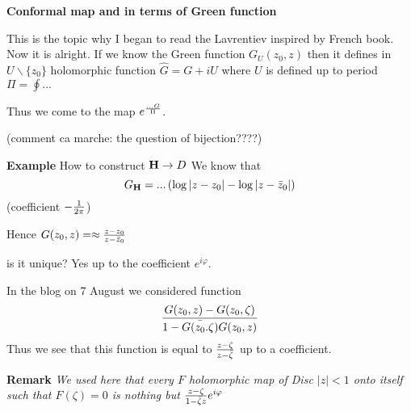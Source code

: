   





\baselineskip=14pt
\def\vare {\varepsilon}
\def\A {{\bf A}}
\def\t {\tilde}
\def\a {\alpha}
\def\K {{\bf K}}
\def\N {{\bf N}}
\def\w {\omega}
\def\s {{\sigma}}
\def\S {{\Sigma}}
\def\s {{\sigma}}
\def\p{\partial}
\def\vare{{\varepsilon}}
\def\Q {{\bf Q}}
\def\D {{\cal D}}
\def\G {{\Gamma}}
\def\C {{\bf C}}
\def\L {{\cal L}}
\def\Z {{\bf Z}}
\def\U  {{\cal U}}
\def\H {{\bf H}}
\def\R  {{\bf R}}
\def\S  {{\bf S}}
\def\E  {{\bf E}}
\def\l {\lambda}
\def\degree {{\bf {\rm degree}\,\,}}
\def \finish {${\,\,\vrule height1mm depth2mm width 8pt}$}
\def \m {\medskip}
\def\p {\partial}
\def\r {{\bf r}}
\def\pt {{\bf pt}}
\def\v {{\bf v}}
\def\n {{\bf n}}
\def\t {{\bf t}}
\def\b {{\bf b}}
\def\c {{\bf c }}
\def\e{{\bf e}}
\def\ac {{\bf a}}
\def \X   {{\bf X}}
\def \Y   {{\bf Y}}
\def \x   {{\bf x}}
\def \y   {{\bf y}}
\def \G{{\cal G}}
\def\ss  {\sigma_{\rm sph}}
\def\grad {{\rm grad\,}}



   {\bf Conformal map and
in terms of Green function}

  This is the topic why I began to read the Lavrentiev inspired
by French book. Now it is alright.
   If we know the Green function $G_U(z_0,z)$  
 then it defines in  $U\backslash \{z_0\}$ holomorphic function
$\hat G=G+iU$ where $U$ 
is defined up to period  $\Pi=\oint...$

Thus we come to  the map $e^{...G\over \Pi}$.

\m

  (comment ca marche: the question of bijection????)

\m

  {\bf Example}  How to construct $\H\to D$
We know that
             $$
  G_\H=...\left(\log|z-z_0|-\log|z-\bar z_0|\right)
             $$
(coefficient $-{1\over 2\pi}$)

  Hence  $G(z_0,z)=\approx {z-z_0\over z-\bar z_0}$

is it unique? Yes up to the coefficient $e^{i\varphi}$. 

 In  the blog on 7 August
we considered function
       $$
    {G(z_0,z)-G(z_0,\zeta)\over 1-\bar{G(z_0.\zeta)} 
G(z_0,z)}
       $$
Thus we see that this function is equal to
      $z-\zeta\over z-\bar\zeta$ up to a coefficient.

{\bf Remark} {\it We used here that every $F$ holomorphic map
of Disc $|z|<1$ onto itself such that $F(\zeta)=0$ 
is nothing but
${z-\zeta\over 1-\bar\zeta z}e^{i\varphi}$ }


\bye
